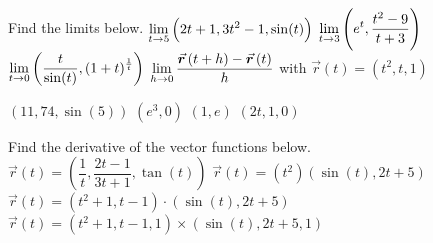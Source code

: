 \subsection*{}
\begin{Exercise}Find the limits below. 
         \Question[difficulty = 1] $\displaystyle\lim_{t\to 5} \left(2t+1,3t^2-1, \sin (t) \right)  $
         \Question[difficulty = 1] $\displaystyle\lim_{t\to 3} \left(e^t,\dfrac{t^2-9}{t+3} \right)  $
         \ifanalysis\Question[difficulty = 1]\fi\ifcalculus\Question[difficulty = 2]\fi $\displaystyle\lim_{t\to 0} \left(\dfrac{t}{\sin(t)}, (1+t)^{\frac{1}{t}} \right)  $
         \ifanalysis\Question[difficulty = 2]\fi\ifcalculus\Question[difficulty = 3]\fi $\dlim_{h\to 0} \dfrac{\vec r\left(t+h \right) - \vec r\left(t \right) }{h}  $ \qquad with \quad $ \vec r(t) = \left(t^2, t, 1 \right) $
\end{Exercise}

\begin{Answer}
    \begin{multicols}{2}
     
         \Question $\left(11,74, \sin (5) \right)  $
         \Question $\left(e^3,0\right)  $
         \Question $\left(1, e \right)  $
         \Question $\left(2t, 1, 0 \right) $
\EndCurrentQuestion
 	\end{multicols}
\end{Answer}

\begin{Exercise} Find the derivative of the vector functions below. 
         \Question[difficulty = 1] $\vec r(t) = \left(\dfrac{1}{t}, \dfrac{2t-1}{3t+1}, \tan(t)  \right)  $
        \Question[difficulty = 1]  $\vec r(t) = \left( t^2 \right) \left(\sin (t), 2t+5  \right)  $
        \ifanalysis\Question[difficulty = 1]\fi\ifcalculus\Question[difficulty = 2]\fi  $\vec r(t) = \left( t^2+1,t-1 \right) \cdot \left(\sin (t), 2t+5  \right)  $
         \ifanalysis\Question[difficulty = 2]\fi\ifcalculus\Question[difficulty = 3]\fi  $\vec r(t) = \left( t^2+1,t-1,1 \right) \times \left(\sin (t), 2t+5,1  \right)  $ 
        \EndCurrentQuestion

\end{Exercise}

